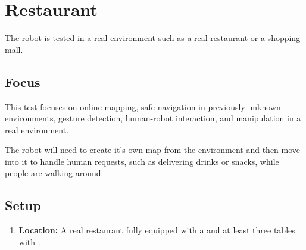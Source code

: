 \section{Restaurant}
The robot is tested in a real environment such as a real restaurant or a shopping mall.

\subsection{Focus}
This test focuses on online mapping, safe navigation in previously unknown environments, gesture detection, human-robot interaction, and manipulation in a real environment.

The robot will need to create it's own map from the environment and then move into it to handle human requests, such as delivering drinks or snacks, while people are walking around.

\subsection{Setup}
\begin{enumerate}
	\item \textbf{Location:} A real restaurant fully equipped with a  and at least three tables with . 
\end{enumerate}

